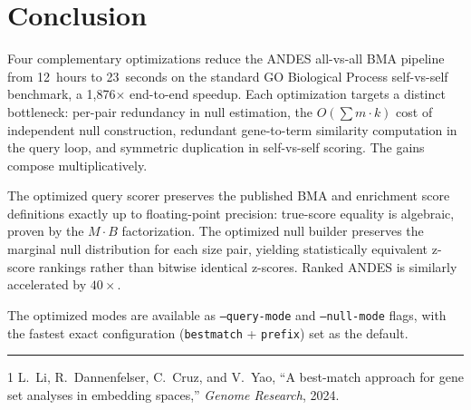 \documentclass[11pt,a4paper]{article}
\begin{document}
\section{Conclusion}

Four complementary optimizations reduce the ANDES all-vs-all BMA pipeline
from 12~hours to 23~seconds on the standard GO Biological Process
self-vs-self benchmark, a 1{,}876$\times$ end-to-end speedup. Each
optimization targets a distinct bottleneck: per-pair redundancy in null
estimation, the $O(\sum m \cdot k)$ cost of independent null construction,
redundant gene-to-term similarity computation in the query loop, and
symmetric duplication in self-vs-self scoring. The gains compose
multiplicatively.

The optimized query scorer preserves the published BMA and enrichment score
definitions exactly up to floating-point precision: true-score equality is
algebraic, proven by the $M \cdot B$ factorization. The optimized null
builder preserves the marginal null distribution for each size pair, yielding
statistically equivalent z-score rankings rather than bitwise identical
z-scores. Ranked ANDES is similarly accelerated by $40\times$.

The optimized modes are available as \texttt{--query-mode} and
\texttt{--null-mode} flags, with the fastest exact configuration
(\texttt{bestmatch} + \texttt{prefix}) set as the default.

\vspace{1em}
\hrule
\vspace{0.5em}

\begin{thebibliography}{1}
	L.~Li, R.~Dannenfelser, C.~Cruz, and V.~Yao,
	``A best-match approach for gene set analyses in embedding spaces,''
	\textit{Genome Research}, 2024.
\end{thebibliography}
\end{document}
